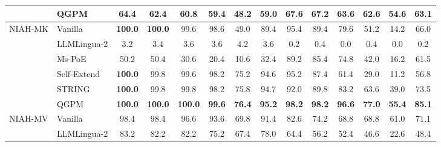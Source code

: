 \documentclass[11pt]{article}
\begin{document}
\begin{table}[t]
\begin{tabular*}{\textwidth}{@{\extracolsep{\fill}} ll cccccc @{\hspace{10pt}} cccccc @{}}
 & QGPM & \phantom{0}64.4 & \phantom{0}62.4 & \phantom{0}60.8 & \textbf{\phantom{0}59.4} & \textbf{\phantom{0}48.2} & \phantom{0}59.0 & \textbf{\phantom{0}67.6} & \textbf{\phantom{0}67.2} & \phantom{0}63.6 & \textbf{\phantom{0}62.6} & \phantom{0}54.6 & \textbf{\phantom{0}63.1} \\
\midrule
\multirow{6}{*}{NIAH-MK} & Vanilla & \textbf{100.0} & \textbf{100.0} & \phantom{0}99.6 & \phantom{0}98.6 & \phantom{0}49.0 & \phantom{0}89.4 & \phantom{0}95.4 & \phantom{0}89.4 & \phantom{0}79.6 & \phantom{0}51.2 & \phantom{0}14.2 & \phantom{0}66.0 \\
 & LLMLingua-2 & \phantom{00}3.2 & \phantom{00}3.4 & \phantom{00}3.6 & \phantom{00}3.6 & \phantom{00}4.2 & \phantom{00}3.6 & \phantom{00}0.2 & \phantom{00}0.4 & \phantom{00}0.0 & \phantom{00}0.4 & \phantom{00}0.0 & \phantom{00}0.2 \\
 & Ms-PoE & \phantom{0}50.2 & \phantom{0}50.4 & \phantom{0}30.6 & \phantom{0}20.4 & \phantom{0}10.6 & \phantom{0}32.4 & \phantom{0}89.2 & \phantom{0}85.4 & \phantom{0}74.8 & \phantom{0}42.0 & \phantom{0}16.2 & \phantom{0}61.5 \\
 & Self-Extend & \textbf{100.0} & \phantom{0}99.8 & \phantom{0}99.6 & \phantom{0}98.2 & \phantom{0}75.2 & \phantom{0}94.6 & \phantom{0}95.2 & \phantom{0}87.4 & \phantom{0}61.4 & \phantom{0}29.0 & \phantom{0}11.2 & \phantom{0}56.8 \\
 & STRING & \textbf{100.0} & \phantom{0}99.8 & \phantom{0}99.8 & \phantom{0}98.2 & \phantom{0}75.8 & \phantom{0}94.7 & \phantom{0}92.0 & \phantom{0}89.8 & \phantom{0}83.2 & \phantom{0}63.6 & \phantom{0}39.0 & \phantom{0}73.5 \\
 & QGPM & \textbf{100.0} & \textbf{100.0} & \textbf{100.0} & \textbf{\phantom{0}99.6} & \textbf{\phantom{0}76.4} & \textbf{\phantom{0}95.2} & \textbf{\phantom{0}98.2} & \textbf{\phantom{0}98.2} & \textbf{\phantom{0}96.6} & \textbf{\phantom{0}77.0} & \textbf{\phantom{0}55.4} & \textbf{\phantom{0}85.1} \\
\midrule
\multirow{6}{*}{NIAH-MV} & Vanilla & \phantom{0}98.4 & \phantom{0}98.4 & \phantom{0}96.6 & \phantom{0}93.6 & \phantom{0}69.8 & \phantom{0}91.4 & \phantom{0}82.6 & \phantom{0}74.2 & \phantom{0}68.8 & \phantom{0}68.8 & \phantom{0}61.0 & \phantom{0}71.1 \\
 & LLMLingua-2 & \phantom{0}83.2 & \phantom{0}82.2 & \phantom{0}82.2 & \phantom{0}75.2 & \phantom{0}67.4 & \phantom{0}78.0 & \phantom{0}64.4 & \phantom{0}56.2 & \phantom{0}52.4 & \phantom{0}46.6 & \phantom{0}22.6 & \phantom{0}48.4 \\

\end{tabular*}
\end{table}
\end{document}
